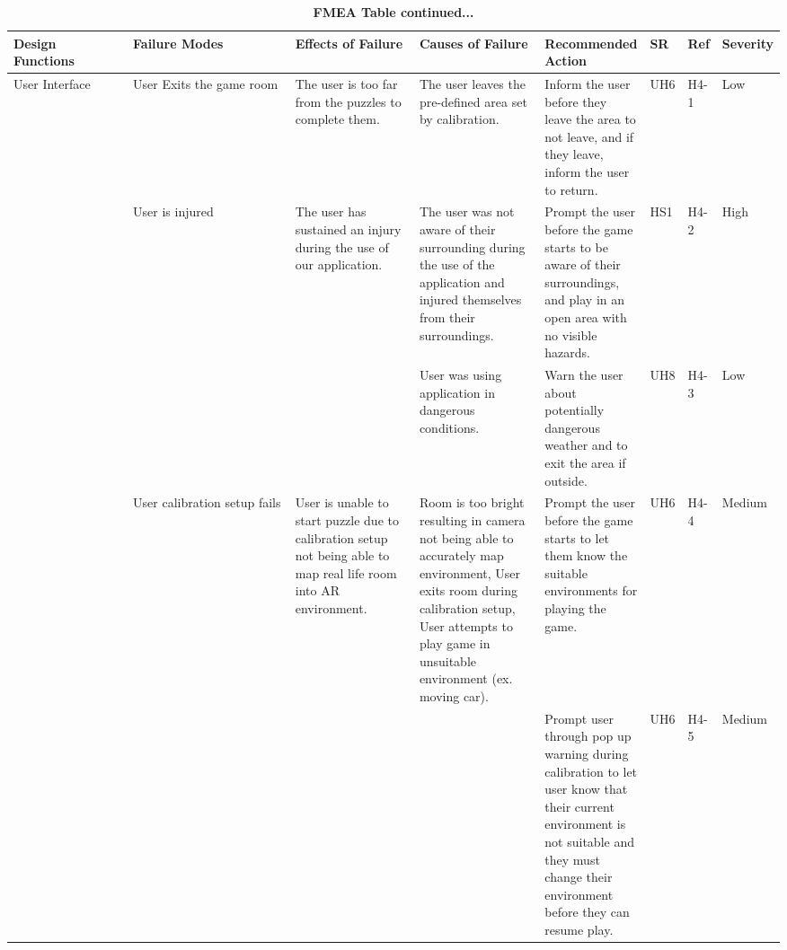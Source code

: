 \documentclass{article}
\begin{document}
\begin{table}[H]
    \begin{adjustbox}{width=(/5)}
    \centering
    

    \begin{tabular}{|p{0.20\linewidth} | p{0.30\linewidth} | p{0.20\linewidth}|  p{0.20\linewidth}|  p{0.30\linewidth}|  p{0.07\linewidth}|  p{0.07\linewidth}|p{0.12\linewidth}| }
    \hline
         \textbf{Design Functions} & \textbf{Failure Modes} & \textbf{Effects of Failure} & \textbf{Causes of Failure} & \textbf{Recommended Action} & \textbf{SR} & \textbf{Ref} & \textbf{Severity}\\
         \hline
          User Interface                   &           User Exits the game room             &           The user is too far from the puzzles to complete them.           &                The user leaves the pre-defined area set by calibration.            &           Inform the user before they leave the area to not leave, and if they leave, inform the user to return.                  &   UH6          &   H4-1           &   Low               \\
            &    User is injured     &    The user has sustained an injury during the use of our application.      &  The user was not aware of their surrounding during the use of the application and injured themselves from their surroundings. \newline                 &    Prompt the user before the game starts to be aware of their surroundings, and play in an open area with no visible hazards.    &  HS1           &   H4-2     & High\\&&& User was using application in dangerous conditions. \newline & Warn the user about potentially dangerous weather and to exit the area if outside. &   UH8   &  H4-3 & Low                \\
                                   &    User calibration setup fails   &   User is unable to start puzzle due to calibration setup not being able to map real life room into AR environment. & Room is too bright resulting in camera not being able to accurately map environment, User exits room during calibration setup, User attempts to play game in unsuitable environment (ex. moving car). & Prompt the user before the game starts to let them know the suitable environments for playing the game. &UH6&H4-4& Medium\\&&&& Prompt user through pop up warning during calibration to let user know that their current environment is not suitable and they must change their environment before they can resume play.   & UH6   & H4-5 & Medium   \\
          \hline
    \end{tabular}
    \end{adjustbox}
    \caption{\bf FMEA Table continued...}
    \label{tab:FMEA2}
\end{table}
\end{document}
